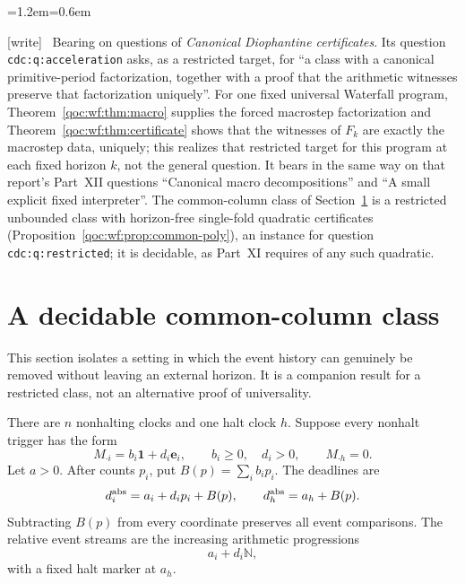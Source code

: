 \documentclass[11pt,letterpaper]{article}
\theoremstyle{definition}
\theoremstyle{remark}
\newcommand{\N}{\mathbb N}
\newcommand{\one}{\mathbf 1}
\newcommand{\wtag}{\textup{[write]}}
\newenvironment{writenote}{\par\smallskip\begin{list}{}{\leftmargin=1.2em\rightmargin=0.6em}\item[]\small\wtag\ }{\end{list}\smallskip}
\newcommand{\lab}[1]{\nolinkurl{#1}}
\begin{document}
\begin{writenote}
Bearing on questions of \emph{Canonical Diophantine certificates}. Its question \lab{cdc:q:acceleration} asks, as a restricted target, for ``a class with a canonical primitive-period factorization, together with a proof that the arithmetic witnesses preserve that factorization uniquely''. For one fixed universal Waterfall program, Theorem~\ref{qoc:wf:thm:macro} supplies the forced macrostep factorization and Theorem~\ref{qoc:wf:thm:certificate} shows that the witnesses of $F_k$ are exactly the macrostep data, uniquely; this realizes that restricted target for this program at each fixed horizon $k$, not the general question. It bears in the same way on that report's Part~XII questions ``Canonical macro decompositions'' and ``A small explicit fixed interpreter''. The common-column class of Section~\ref{qoc:wf:sec:common} is a restricted unbounded class with horizon-free single-fold quadratic certificates (Proposition~\ref{qoc:wf:prop:common-poly}), an instance for question \lab{cdc:q:restricted}; it is decidable, as Part~XI requires of any such quadratic.
\end{writenote}

\section{A decidable common-column class}\label{qoc:wf:sec:common}
This section isolates a setting in which the event history can genuinely be removed without leaving an external horizon. It is a companion result for a restricted class, not an alternative proof of universality.

There are $n$ nonhalting clocks and one halt clock $h$. Suppose every nonhalt trigger has the form
\begin{equation}\label{qoc:wf:eq:commoncolumn}
 M_{\cdot i}=b_i\one+d_i\mathbf e_i,\qquad b_i\ge0,\quad d_i>0,
 \qquad M_{\cdot h}=0.
\end{equation}
Let $a>0$. After counts $p_i$, put $B(p)=\sum_i b_ip_i$. The deadlines are
\[
 d^{\rm abs}_i=a_i+d_ip_i+B(p),\qquad
 d^{\rm abs}_h=a_h+B(p).
\]
Subtracting $B(p)$ from every coordinate preserves all event comparisons. The relative event streams are the increasing arithmetic progressions
\begin{equation}\label{qoc:wf:eq:streams}
 a_i+d_i\N,
\end{equation}
with a fixed halt marker at $a_h$.
\end{document}
